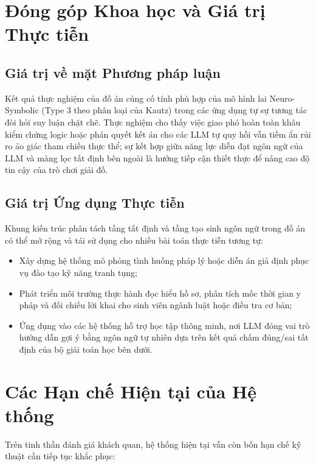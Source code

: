 \section{Đóng góp Khoa học và Giá trị Thực tiễn}
\label{sec:conclusion_contributions}

\subsection{Giá trị về mặt Phương pháp luận}
Kết quả thực nghiệm của đồ án củng cố tính phù hợp của mô hình lai Neuro-Symbolic (Type 3 theo phân loại của Kautz) trong các ứng dụng tự sự tương tác đòi hỏi suy luận chặt chẽ. Thực nghiệm cho thấy việc giao phó hoàn toàn khâu kiểm chứng logic hoặc phán quyết kết án cho các LLM tự quy hồi vẫn tiềm ẩn rủi ro ảo giác tham chiếu thực thể; sự kết hợp giữa năng lực diễn đạt ngôn ngữ của LLM và màng lọc tất định bên ngoài là hướng tiếp cận thiết thực để nâng cao độ tin cậy của trò chơi giải đố.

\subsection{Giá trị Ứng dụng Thực tiễn}
Khung kiến trúc phân tách tầng tất định và tầng tạo sinh ngôn ngữ trong đồ án có thể mở rộng và tái sử dụng cho nhiều bài toán thực tiễn tương tự:
\begin{itemize}[leftmargin=1.5cm]
    \item Xây dựng hệ thống mô phỏng tình huống pháp lý hoặc diễn án giả định phục vụ đào tạo kỹ năng tranh tụng;
    \item Phát triển môi trường thực hành đọc hiểu hồ sơ, phân tích mốc thời gian y pháp và đối chiếu lời khai cho sinh viên ngành luật hoặc điều tra cơ bản;
    \item Ứng dụng vào các hệ thống hỗ trợ học tập thông minh, nơi LLM đóng vai trò hướng dẫn gợi ý bằng ngôn ngữ tự nhiên dựa trên kết quả chấm đúng/sai tất định của bộ giải toán học bên dưới.
\end{itemize}

\section{Các Hạn chế Hiện tại của Hệ thống}
\label{sec:conclusion_limitations}

Trên tinh thần đánh giá khách quan, hệ thống hiện tại vẫn còn bốn hạn chế kỹ thuật cần tiếp tục khắc phục:

